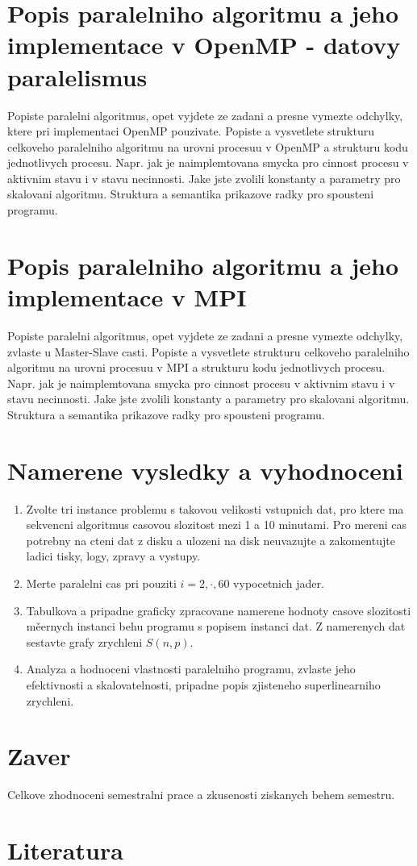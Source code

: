 \documentclass{article}
\begin{document}
    \section{Popis paralelniho algoritmu a jeho implementace v OpenMP - datovy paralelismus}

    Popiste paralelni algoritmus, opet vyjdete ze zadani a presne vymezte
    odchylky, ktere pri implementaci OpenMP pouzivate.
    Popiste a vysvetlete strukturu celkoveho
    paralelniho algoritmu na urovni procesuu v OpenMP a strukturu kodu
    jednotlivych procesu. Napr. jak je naimplemtovana smycka pro cinnost
    procesu v aktivnim stavu i v stavu necinnosti. Jake jste zvolili
    konstanty a parametry pro skalovani algoritmu. Struktura a semantika
    prikazove radky pro spousteni programu.


    \section{Popis paralelniho algoritmu a jeho implementace v MPI}

    Popiste paralelni algoritmus, opet vyjdete ze zadani a presne vymezte
    odchylky, zvlaste u Master-Slave casti. Popiste a vysvetlete strukturu celkoveho
    paralelniho algoritmu na urovni procesuu v MPI a strukturu kodu
    jednotlivych procesu. Napr. jak je naimplemtovana smycka pro cinnost
    procesu v aktivnim stavu i v stavu necinnosti. Jake jste zvolili
    konstanty a parametry pro skalovani algoritmu. Struktura a semantika
    prikazove radky pro spousteni programu.


    \section{Namerene vysledky a vyhodnoceni}

    \begin{enumerate}
        \item Zvolte tri instance problemu s takovou velikosti vstupnich dat, pro ktere ma sekvencni
        algoritmus casovou slozitost mezi 1 a 10 minutami.
        Pro mereni cas potrebny na cteni dat z disku a ulozeni na disk neuvazujte a zakomentujte
        ladici tisky, logy, zpravy a vystupy.
        \item Merte paralelni cas pri pouziti $i=2,\cdot,60$ vypocetnich jader.
        \item Tabulkova a pripadne graficky zpracovane namerene hodnoty casove slozitosti měernych instanci behu programu s popisem instanci dat. Z namerenych dat sestavte grafy zrychleni $S(n,p)$.
        \item Analyza a hodnoceni vlastnosti paralelniho programu, zvlaste jeho efektivnosti a skalovatelnosti, pripadne popis zjisteneho superlinearniho zrychleni.

    \end{enumerate}


    \section{Zaver}

    Celkove zhodnoceni semestralni prace a zkusenosti ziskanych behem semestru.


    \section{Literatura}
\end{document}
